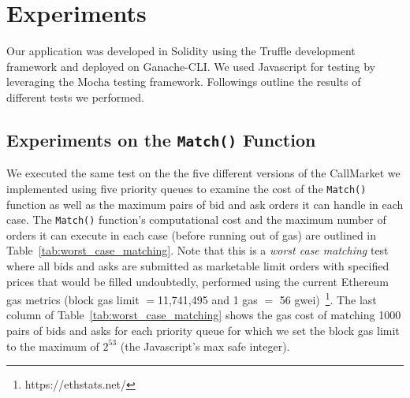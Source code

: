 \section{Experiments}

Our application was developed in Solidity using the Truffle development framework and deployed on Ganache-CLI. We used Javascript for testing by leveraging the Mocha testing framework. Followings outline the results of different tests we performed.


 \subsection{Experiments on the \texttt{Match()} Function}

We executed the same test on the the five different versions of the CallMarket we implemented using five priority queues to examine the cost of the \texttt{Match()} function as well as the maximum pairs of bid and ask orders it can handle in each case. The \texttt{Match()} function's computational cost and the maximum number of orders it can execute in each case (before running out of gas) are outlined in Table~\ref{tab:worst_case_matching}. Note that this is a \textit{worst case matching} test where all bids and asks are submitted as marketable limit orders with specified prices that would be filled undoubtedly, performed using the current Ethereum gas metrics (block gas limit $=$11,741,495 and 1 gas $=$ 56 gwei)~\footnote{https://ethstats.net/}. The last column of Table~\ref{tab:worst_case_matching} shows the gas cost of matching 1000 pairs of bids and asks for each priority queue for which we set the block gas limit to the maximum of  $2^{53}$ (the Javascript's max safe integer).




